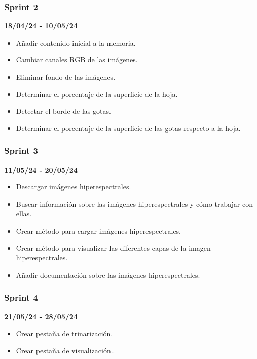 \subsubsection{Sprint 2}
\textbf{18/04/24 - 10/05/24}
\begin{itemize}
    \item Añadir contenido inicial a la memoria.
    \item Cambiar canales RGB de las imágenes.
    \item Eliminar fondo de las imágenes.
    \item Determinar el porcentaje de la superficie de la hoja.
    \item Detectar el borde de las gotas.
    \item Determinar el porcentaje de la superficie de las gotas respecto a la hoja.
\end{itemize}

\subsubsection{Sprint 3}
\textbf{11/05/24 - 20/05/24}
\begin{itemize}
    \item Descargar imágenes hiperespectrales.
    \item Buscar información sobre las imágenes hiperespectrales y cómo trabajar con ellas.
    \item Crear método para cargar imágenes hiperespectrales.
    \item Crear método para visualizar las diferentes capas de la imagen hiperespectrales.
    \item Añadir documentación sobre las imágenes hiperespectrales.
\end{itemize}

\subsubsection{Sprint 4}
\textbf{21/05/24 - 28/05/24}
\begin{itemize}
    \item Crear pestaña de trinarización.
    \item Crear pestaña de visualización..
\end{itemize}

